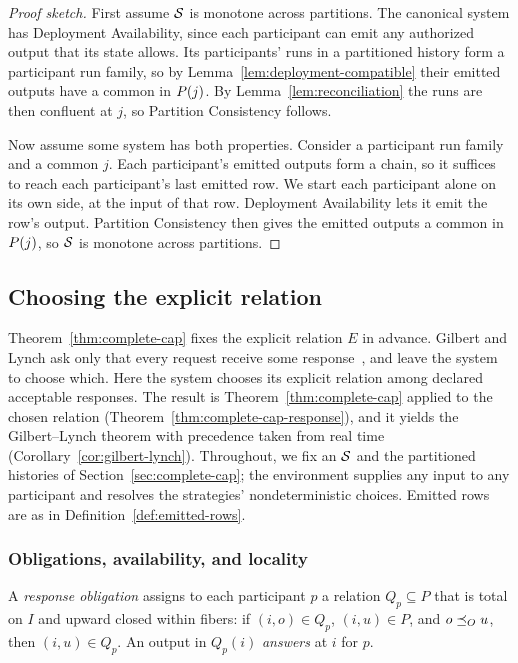 \begin{proof}[Proof sketch]
First assume $\mathcal{S}$ is monotone across partitions.  The canonical system has
Deployment Availability, since each participant can emit any authorized output
that its state allows.  Its participants' runs in a partitioned history form a
participant run family, so by Lemma~\ref{lem:deployment-compatible} their
emitted outputs have a common \outnoun in $P(j)$.  By
Lemma~\ref{lem:reconciliation} the runs are then confluent at $j$, so
Partition Consistency follows.

Now assume some system has both properties.  Consider a participant run
family and a common \indesc $j$.  Each participant's emitted outputs form a
chain, so it suffices to reach each participant's last emitted row.  We start
each participant alone on its own side, at the input of that row.  Deployment
Availability lets it emit the row's output.  Partition Consistency then gives
the emitted outputs a common \outnoun in $P(j)$, so $\mathcal{S}$ is monotone
across partitions.
\end{proof}

\subsection{Choosing the explicit relation}
\label{app:cap-response}

Theorem~\ref{thm:complete-cap} fixes the explicit relation $E$ in advance.
Gilbert and Lynch ask only that every request receive some
response~\cite{gilbert2002cap}, and leave the system to choose which.  Here
the system chooses its explicit relation among declared acceptable responses.
The result is Theorem~\ref{thm:complete-cap} applied to the chosen relation
(Theorem~\ref{thm:complete-cap-response}), and it yields the Gilbert--Lynch
theorem with precedence taken from real time (Corollary~\ref{cor:gilbert-lynch}).
Throughout, we fix an \spectype $\mathcal{S}$ and the partitioned histories of
Section~\ref{sec:complete-cap}; the environment supplies any input to any
participant and resolves the strategies' nondeterministic choices.  Emitted
rows are as in Definition~\ref{def:emitted-rows}.

\subsubsection{Obligations, availability, and locality}

\begin{definition}
\label{def:response-obligation}
A \emph{response obligation} assigns to each participant $p$ a relation
$Q_p\subseteq P$ that is total on $I$ and upward closed within fibers: if
$(i,o)\in Q_p$, $(i,u)\in P$, and $o\preceq_O u$, then $(i,u)\in Q_p$.  An
output in $Q_p(i)$ \emph{answers} at $i$ for $p$.
\end{definition}


